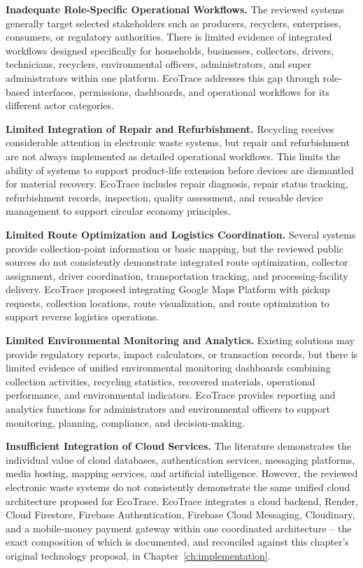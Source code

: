 \textbf{Inadequate Role-Specific Operational Workflows.} The reviewed
systems generally target selected stakeholders such as producers, recyclers,
enterprises, consumers, or regulatory authorities. There is limited evidence of
integrated workflows designed specifically for households, businesses, collectors,
drivers, technicians, recyclers, environmental officers, administrators, and super
administrators within one platform. EcoTrace addresses this gap through
role-based interfaces, permissions, dashboards, and operational workflows for its
different actor categories.

\textbf{Limited Integration of Repair and Refurbishment.} Recycling receives
considerable attention in electronic waste systems, but repair and refurbishment
are not always implemented as detailed operational workflows. This limits the
ability of systems to support product-life extension before devices are dismantled
for material recovery. EcoTrace includes repair diagnosis, repair status tracking,
refurbishment records, inspection, quality assessment, and reusable device
management to support circular economy principles.

\textbf{Limited Route Optimization and Logistics Coordination.} Several
systems provide collection-point information or basic mapping, but the reviewed
public sources do not consistently demonstrate integrated route optimization,
collector assignment, driver coordination, transportation tracking, and
processing-facility delivery. EcoTrace proposed integrating Google Maps Platform
with pickup requests, collection locations, route visualization, and route
optimization to support reverse logistics operations.

\textbf{Limited Environmental Monitoring and Analytics.} Existing solutions
may provide regulatory reports, impact calculators, or transaction records, but
there is limited evidence of unified environmental monitoring dashboards
combining collection activities, recycling statistics, recovered materials,
operational performance, and environmental indicators. EcoTrace provides
reporting and analytics functions for administrators and environmental officers to
support monitoring, planning, compliance, and decision-making.

\textbf{Insufficient Integration of Cloud Services.} The literature demonstrates
the individual value of cloud databases, authentication services, messaging
platforms, media hosting, mapping services, and artificial intelligence. However,
the reviewed electronic waste systems do not consistently demonstrate the same
unified cloud architecture proposed for EcoTrace. EcoTrace integrates a cloud
backend, Render, Cloud Firestore, Firebase Authentication, Firebase Cloud
Messaging, Cloudinary, and a mobile-money payment gateway within one
coordinated architecture -- the exact composition of which is documented, and
reconciled against this chapter's original technology proposal, in
Chapter~\ref{ch:implementation}.

